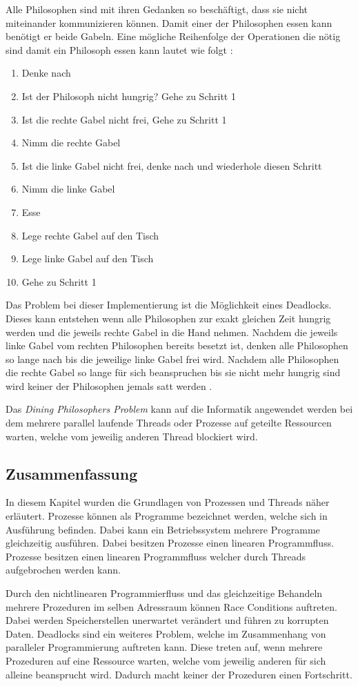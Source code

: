 Alle Philosophen sind mit ihren Gedanken so beschäftigt, dass sie nicht miteinander kommunizieren können. Damit einer der Philosophen essen kann benötigt er beide Gabeln. Eine mögliche Reihenfolge der Operationen die nötig sind damit ein Philosoph essen kann lautet wie folgt \cite[p. 21]{dij71}:

\begin{enumerate}
  \item Denke nach
  \item Ist der Philosoph nicht hungrig? Gehe zu Schritt 1
  \item Ist die rechte Gabel nicht frei, Gehe zu Schritt 1
  \item Nimm die rechte Gabel
  \item Ist die linke Gabel nicht frei, denke nach und wiederhole diesen Schritt
  \item Nimm die linke Gabel
  \item Esse
  \item Lege rechte Gabel auf den Tisch  
  \item Lege linke Gabel auf den Tisch
  \item Gehe zu Schritt 1
\end{enumerate}

Das Problem bei dieser Implementierung ist die Möglichkeit eines Deadlocks. Dieses kann entstehen wenn alle Philosophen zur exakt gleichen Zeit hungrig werden und die jeweils rechte Gabel in die Hand nehmen. Nachdem die jeweils linke Gabel vom rechten Philosophen bereits besetzt ist, denken alle Philosophen so lange nach bis die jeweilige linke Gabel frei wird. Nachdem alle Philosophen die rechte Gabel so lange für sich beanspruchen bis sie nicht mehr hungrig sind wird keiner der Philosophen jemals satt werden \cite[p. 21]{dij71}. 

Das \emph{Dining Philosophers Problem} kann auf die Informatik angewendet werden bei dem mehrere parallel laufende Threads oder Prozesse auf geteilte Ressourcen warten, welche vom jeweilig anderen Thread blockiert wird.

\subsection{Zusammenfassung}
In diesem Kapitel wurden die Grundlagen von Prozessen und Threads näher erläutert. Prozesse können als Programme bezeichnet werden, welche sich in Ausführung befinden. Dabei kann ein Betriebssystem mehrere Programme gleichzeitig ausführen. Dabei besitzen Prozesse einen linearen Programmfluss. Prozesse besitzen einen linearen Programmfluss welcher durch Threads aufgebrochen werden kann.

Durch den nichtlinearen Programmierfluss und das gleichzeitige Behandeln mehrere Prozeduren im selben Adressraum können Race Conditions auftreten. Dabei werden Speicherstellen unerwartet verändert und führen zu korrupten Daten. Deadlocks sind ein weiteres Problem, welche im Zusammenhang von paralleler Programmierung auftreten kann. Diese treten auf, wenn mehrere Prozeduren auf eine Ressource warten, welche vom jeweilig anderen für sich alleine beansprucht wird. Dadurch macht keiner der Prozeduren einen Fortschritt. 